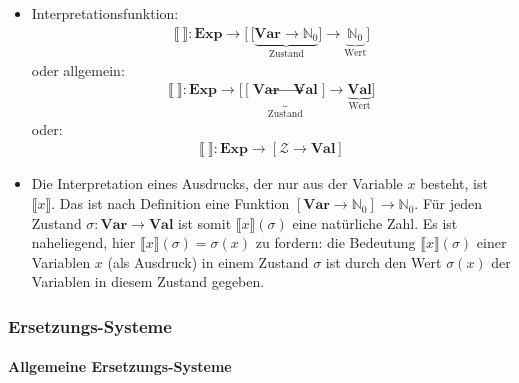 \documentclass[
  a4paper,
  11pt,
]{scrartcl}
\newcommand{\N}{\mathbb{N}}
\newcommand{\Zc}{\mathcal{Z}}
\begin{document}
\begin{itemize}
  \item Interpretationsfunktion:
    \begin{align*}
      \llbracket \ \rrbracket:
        \textbf{Exp} \rightarrow
          \Big[ \,
            \big[
              \underbrace{\textbf{Var} \rightarrow \N_0}_{\text{Zustand}}
            \big]
            \rightarrow
            \underbrace{\N_0}_{\text{Wert}}
          \Big]
    \end{align*}
    oder allgemein:
    \begin{align*}
      \llbracket \ \rrbracket:
        \textbf{Exp} \rightarrow
          \Big[ \,
            \big[
              \underbrace{\textbf{Var} \rightarrow \textbf{Val}}_{\text{Zustand}}
            \big]
            \rightarrow
            \underbrace{\textbf{Val}}_{\text{Wert}}
          \Big]
    \end{align*}
    oder:
    \begin{align*}
      \llbracket \ \rrbracket:
        \textbf{Exp} \rightarrow
          \left[\Zc \rightarrow \textbf{Val} \right]
    \end{align*}

  \item Die Interpretation eines Ausdrucks, der nur aus der Variable $x$
    besteht, ist $\llbracket x \rrbracket$. Das ist nach Definition eine
    Funktion $\left[ \textbf{Var} \rightarrow \N_0 \right] \rightarrow \N_0$.
    Für jeden Zustand $\sigma: \textbf{Var} \rightarrow \textbf{Val}$ ist somit
    $\llbracket x \rrbracket (\sigma)$ eine natürliche Zahl. Es ist naheliegend,
    hier $\llbracket x \rrbracket (\sigma) = \sigma(x)$ zu fordern: die
    Bedeutung $\llbracket x \rrbracket (\sigma)$ einer Variablen $x$ (als
    Ausdruck) in einem Zustand $\sigma$ ist durch den Wert $\sigma(x)$ der
    Variablen in diesem Zustand gegeben.
\end{itemize}

\subsubsection{Ersetzungs-Systeme}
\label{ssub:Ersetzungs-Systeme}

\paragraph{Allgemeine Ersetzungs-Systeme}
\label{par:allgemeine_ersetzungs_systeme}
\end{document}
